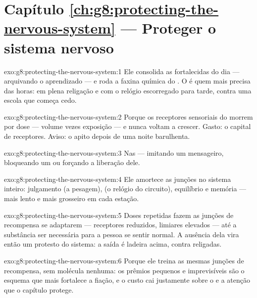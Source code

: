 \section*{Capítulo \ref{ch:g8:protecting-the-nervous-system} --- Proteger o sistema nervoso}

\begin{solution}{exo:g8:protecting-the-nervous-system:1}
Ele consolida as  fortalecidas do dia --- arquivando o
aprendizado --- e roda a faxina química do . O 
 é quem mais precisa das horas: em plena religação e com o
relógio escorregado para tarde, contra uma escola que começa cedo.
\end{solution}

\begin{solution}{exo:g8:protecting-the-nervous-system:2}
Porque os receptores sensoriais do  morrem por dose --- volume
vezes exposição --- e nunca voltam a crescer. Gasto: o capital de
receptores. Aviso: o apito depois de uma noite barulhenta.
\end{solution}

\begin{solution}{exo:g8:protecting-the-nervous-system:3}
Nas  --- imitando um mensageiro, bloqueando um ou forçando a
liberação dele.
\end{solution}

\begin{solution}{exo:g8:protecting-the-nervous-system:4}
Ele amortece as junções no sistema inteiro: julgamento (a pesagem),
 (o relógio do circuito), equilíbrio e memória --- mais
lento e mais grosseiro em cada estação.
\end{solution}

\begin{solution}{exo:g8:protecting-the-nervous-system:5}
Doses repetidas fazem as junções de recompensa se adaptarem ---
receptores reduzidos, limiares elevados --- até a substância ser
necessária para a pessoa se sentir normal. A ausência dela vira então
um protesto do sistema: a saída é ladeira acima, contra 
religadas.
\end{solution}

\begin{solution}{exo:g8:protecting-the-nervous-system:6}
Porque ele treina as mesmas junções de recompensa, sem molécula
nenhuma: os prêmios pequenos e imprevisíveis são o esquema que mais
fortalece a fiação, e o custo cai justamente sobre o  e a atenção
que o capítulo protege.
\end{solution}

